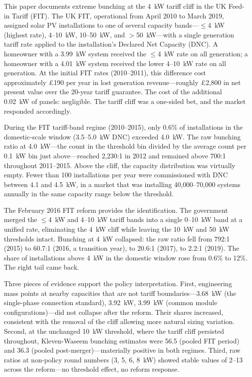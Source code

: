 \documentclass[12pt]{article}
\begin{document}
This paper documents extreme bunching at the 4~kW tariff cliff in the UK Feed-in Tariff (FIT). The UK FIT, operational from April 2010 to March 2019, assigned solar PV installations to one of several capacity bands---$\leq$4~kW (highest rate), 4--10~kW, 10--50~kW, and $>$50~kW---with a single generation tariff rate applied to the installation's Declared Net Capacity (DNC). A homeowner with a 3.99~kW system received the $\leq$4~kW rate on all generation; a homeowner with a 4.01~kW system received the lower 4--10~kW rate on all generation. At the initial FIT rates (2010--2011), this difference cost approximately \pounds 190 per year in lost generation revenue---roughly \pounds 2,800 in net present value over the 20-year tariff guarantee. The cost of the additional 0.02~kW of panels: negligible. The tariff cliff was a one-sided bet, and the market responded accordingly.

During the FIT tariff-band regime (2010--2015), only 0.6\% of installations in the domestic-scale window (3.5--5.0~kW DNC) exceeded 4.0~kW. The raw bunching ratio at 4.0~kW---the count in the threshold bin divided by the average count per 0.1~kW bin just above---reached 2,230:1 in 2012 and remained above 700:1 throughout 2011--2015. Above the cliff, the capacity distribution was virtually empty. Fewer than 100 installations per year were commissioned with DNC between 4.1 and 4.5~kW, in a market that was installing 40,000--70,000 systems annually in the same capacity range below the threshold.

The February 2016 FIT reform provides the identification. The government merged the $\leq$4~kW and 4--10~kW tariff bands into a single 0--10~kW band at a unified rate, eliminating the 4~kW cliff while leaving the 10~kW and 50~kW thresholds intact. Bunching at 4~kW collapsed: the raw ratio fell from 792:1 (2015) to 60.7:1 (2016, a transition year), to 20.6:1 (2017), to 2.2:1 (2019). The share of installations above 4~kW in the domestic window rose from 0.6\% to 12\%. The right tail came back.

Three pieces of evidence support the policy interpretation. First, engineering mass points at nearby capacities that are not tariff boundaries---3.68~kW (the single-phase connection standard), 3.92~kW, 3.99~kW (common module configurations)---did not collapse after the reform. Their shares increased, consistent with the removal of the cliff allowing more natural sizing variation. Second, at the unchanged 10~kW threshold, where the tariff cliff persisted throughout, Kleven-Waseem bunching estimates were 56.5 (pooled FIT period) and 36.3 (pooled post-merger)---materially positive in both regimes. Third, raw ratios at non-policy round numbers (3, 5, 6, 8~kW) showed stable values of 2--13 across the reform---no threshold effect, no reform response.
\end{document}
